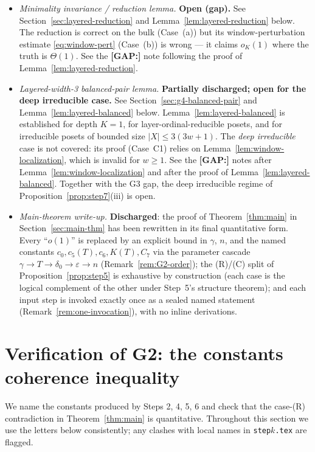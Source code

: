 \begin{itemize}[leftmargin=*]
 \item[\textbf{G3}] \emph{Minimality invariance / reduction lemma.}
 \textbf{Open (gap).} See Section~\ref{sec:layered-reduction} and
 Lemma~\ref{lem:layered-reduction} below. The reduction is correct on
 the bulk (Case~(a)) but its window-perturbation estimate
 \eqref{eq:window-pert} (Case~(b)) is wrong --- it claims $o_K(1)$
 where the truth is $\Theta(1)$. See the \textbf{[GAP:]} note
 following the proof of Lemma~\ref{lem:layered-reduction}.

 \item[\textbf{G4}] \emph{Layered-width-3 balanced-pair lemma.}
 \textbf{Partially discharged; open for the deep irreducible case.}
 See Section~\ref{sec:g4-balanced-pair} and
 Lemma~\ref{lem:layered-balanced} below.
 Lemma~\ref{lem:layered-balanced} is established for depth $K = 1$,
 for layer-ordinal-reducible posets, and for irreducible posets of
 bounded size $|X| \le 3(3w+1)$. The \emph{deep irreducible} case is
 not covered: its proof (Case~C1) relies on
 Lemma~\ref{lem:window-localization}, which is invalid for $w \ge 1$.
 See the \textbf{[GAP:]} notes after
 Lemma~\ref{lem:window-localization} and after the proof of
 Lemma~\ref{lem:layered-balanced}. Together with the G3 gap, the deep
 irreducible regime of Proposition~\ref{prop:step7}(iii) is open.

 \item[\textbf{G5}] \emph{Main-theorem write-up.} \textbf{Discharged}:
 the proof of Theorem~\ref{thm:main} in Section~\ref{sec:main-thm}
 has been rewritten in its final quantitative form. Every ``$o(1)$''
 is replaced by an explicit bound in $\gamma$, $n$, and the named
 constants $c_0, c_5(T), c_6, K(T), C_7$ via the parameter cascade
 $\gamma \to T \to \delta_0 \to \varepsilon \to n$
 (Remark~\ref{rem:G2-order}); the (R)/(C) split of
 Proposition~\ref{prop:step5} is exhaustive by construction (each case
 is the logical complement of the other under Step~5's structure
 theorem); and each input step is invoked exactly once as a sealed
 named statement (Remark~\ref{rem:one-invocation}), with no inline
 derivations.
\end{itemize}

\section{Verification of G2: the constants coherence inequality}
\label{sec:G2-constants}

We name the constants produced by Steps 2, 4, 5, 6 and check that the
case-(R) contradiction in Theorem~\ref{thm:main} is quantitative.
Throughout this section we use the letters below consistently; any
clashes with local names in \texttt{step$k$.tex} are flagged.

